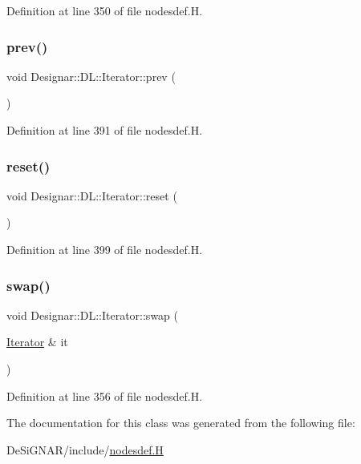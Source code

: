 Definition at line 350 of file nodesdef.\+H.

\mbox{\label{class_designar_1_1_d_l_1_1_iterator_a8550a08d7c7645c8ec41ba209ee21893}} 
\subsubsection{\texorpdfstring{prev()}{prev()}}
{\footnotesize\ttfamily void Designar\+::\+D\+L\+::\+Iterator\+::prev (\begin{DoxyParamCaption}{ }\end{DoxyParamCaption})\hspace{0.3cm}{\ttfamily [inline]}}



Definition at line 391 of file nodesdef.\+H.

\mbox{\label{class_designar_1_1_d_l_1_1_iterator_a7708230beaa8a47d664878d37c11bbd3}} 
\subsubsection{\texorpdfstring{reset()}{reset()}}
{\footnotesize\ttfamily void Designar\+::\+D\+L\+::\+Iterator\+::reset (\begin{DoxyParamCaption}{ }\end{DoxyParamCaption})\hspace{0.3cm}{\ttfamily [inline]}}



Definition at line 399 of file nodesdef.\+H.

\mbox{\label{class_designar_1_1_d_l_1_1_iterator_af8bba1d661f8d6300664481d7c6fd976}} 
\subsubsection{\texorpdfstring{swap()}{swap()}}
{\footnotesize\ttfamily void Designar\+::\+D\+L\+::\+Iterator\+::swap (\begin{DoxyParamCaption}\item[{\hyperlink{class_designar_1_1_d_l_1_1_iterator}{Iterator} \&}]{it }\end{DoxyParamCaption})\hspace{0.3cm}{\ttfamily [inline]}}



Definition at line 356 of file nodesdef.\+H.



The documentation for this class was generated from the following file\+:\begin{DoxyCompactItemize}
\item 
De\+Si\+G\+N\+A\+R/include/\hyperlink{nodesdef_8_h}{nodesdef.\+H}\end{DoxyCompactItemize}
